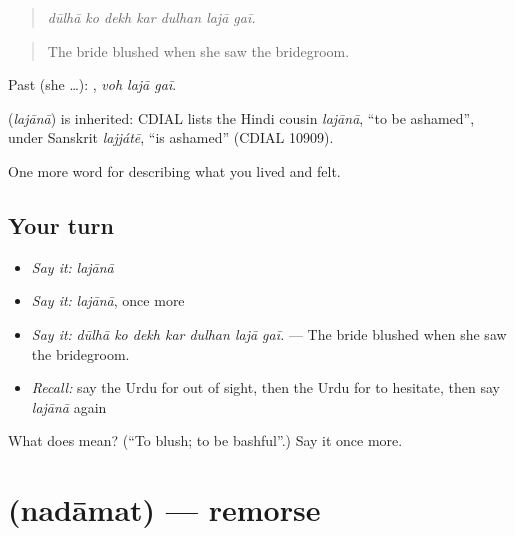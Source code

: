 \begin{quote}
      
\end{quote}

\begin{quote}
\emph{dūlhā ko dekh kar dulhan lajā gaī.}
\end{quote}

\begin{quote}
The bride blushed when she saw the bridegroom.
\end{quote}

Past (she …):   , \emph{voh lajā gaī}.

\begin{cousinweb}
\textbf{} (\emph{lajānā}) is inherited: CDIAL lists the Hindi cousin \emph{lajānā}, \textquotedblleft{}to be ashamed\textquotedblright{}, under Sanskrit \emph{lajjátē}, \textquotedblleft{}is ashamed\textquotedblright{} (CDIAL 10909).
\end{cousinweb}

\begin{grammarlens}[title={What you've built}]
One more word for describing what you lived and felt.
\end{grammarlens}

\subsection*{Your turn}
\begin{itemize}
\raggedright
  \item \emph{Say it:} \emph{lajānā}
  \item \emph{Say it:} \emph{lajānā}, once more
  \item \emph{Say it:} \emph{dūlhā ko dekh kar dulhan lajā gaī.} — The bride blushed when she saw the bridegroom.
  \item \emph{Recall:} say the Urdu for out of sight, then the Urdu for to hesitate, then say \emph{lajānā} again
\end{itemize}

\begin{tcolorbox}[breakable,colback=teal!4,colframe=teal!35!black,title={Before you move on}]
What does  mean? (\textquotedblleft{}To blush; to be bashful\textquotedblright{}.) Say it once more.
\end{tcolorbox}
\section[\texorpdfstring{\ur{ندامت} (nadāmat)}{ندامت (nadāmat)}]{ (nadāmat) — remorse}


